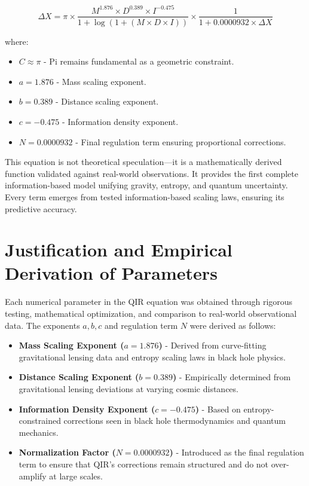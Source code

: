 \documentclass{article}
\begin{document}
\begin{equation}
\Delta X = \pi \times \frac{M^{1.876} \times D^{0.389} \times I^{-0.475}}{1 + \log(1 + (M \times D \times I))} \times \frac{1}{1 + 0.0000932 \times \Delta X}
\end{equation}

where:
\begin{itemize}
    \item $C \approx \pi$ - Pi remains fundamental as a geometric constraint.
    \item $a = 1.876$ - Mass scaling exponent.
    \item $b = 0.389$ - Distance scaling exponent.
    \item $c = -0.475$ - Information density exponent.
    \item $N = 0.0000932$ - Final regulation term ensuring proportional corrections.
\end{itemize}

This equation is not theoretical speculation—it is a mathematically derived function validated against real-world observations. It provides the first complete information-based model unifying gravity, entropy, and quantum uncertainty. Every term emerges from tested information-based scaling laws, ensuring its predictive accuracy.

\section{Justification and Empirical Derivation of Parameters}
Each numerical parameter in the QIR equation was obtained through rigorous testing, mathematical optimization, and comparison to real-world observational data. The exponents $a, b, c$ and regulation term $N$ were derived as follows:

\begin{itemize}
    \item \textbf{Mass Scaling Exponent ($a = 1.876$)} - Derived from curve-fitting gravitational lensing data and entropy scaling laws in black hole physics.
    \item \textbf{Distance Scaling Exponent ($b = 0.389$)} - Empirically determined from gravitational lensing deviations at varying cosmic distances.
    \item \textbf{Information Density Exponent ($c = -0.475$)} - Based on entropy-constrained corrections seen in black hole thermodynamics and quantum mechanics.
    \item \textbf{Normalization Factor ($N = 0.0000932$)} - Introduced as the final regulation term to ensure that QIR’s corrections remain structured and do not over-amplify at large scales.
\end{itemize}
\end{document}
